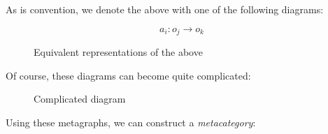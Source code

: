 \documentclass{fkbook}
\theoremstyle{snazzydefinition}
\begin{document}
As is convention, we denote the above with one of the following
diagrams:
\begin{figure}[H]
  \centering
  \begin{minipage}{.33\linewidth}
    \[
      a_i : o_j \to o_k
    \]
  \end{minipage}
  \begin{minipage}{.33\linewidth}
  \end{minipage}
  \caption{Equivalent representations of the above}
\end{figure}
Of course, these diagrams can become quite complicated:
\begin{figure}[H]
  \centering
  \caption{Complicated diagram}
\end{figure}
Using these metagraphs, we can construct a \emph{metacategory}:
\end{document}
